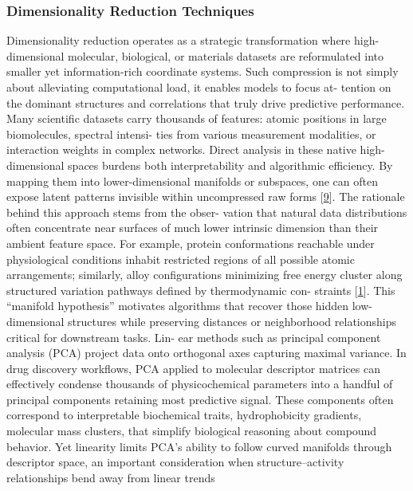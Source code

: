 \documentclass[
]{article}
\begin{document}
\subsubsection{Dimensionality Reduction
Techniques}\label{dimensionality-reduction-techniques}

Dimensionality reduction operates as a strategic transformation where
high-dimensional molecular, biological, or materials datasets are
reformulated into smaller yet information-rich coordinate systems. Such
compression is not simply about alleviating computational load, it
enables models to focus at- tention on the dominant structures and
correlations that truly drive predictive performance. Many scientific
datasets carry thousands of features: atomic positions in large
biomolecules, spectral intensi- ties from various measurement
modalities, or interaction weights in complex networks. Direct analysis
in these native high-dimensional spaces burdens both interpretability
and algorithmic efficiency. By mapping them into lower-dimensional
manifolds or subspaces, one can often expose latent patterns invisible
within uncompressed raw forms {[}\hyperref[_bookmark49]{9}{]}. The
rationale behind this approach stems from the obser- vation that natural
data distributions often concentrate near surfaces of much lower
intrinsic dimension than their ambient feature space. For example,
protein conformations reachable under physiological conditions inhabit
restricted regions of all possible atomic arrangements; similarly, alloy
configurations minimizing free energy cluster along structured variation
pathways defined by thermodynamic con- straints
{[}\hyperref[_bookmark41]{1}{]}. This ``manifold hypothesis'' motivates
algorithms that recover those hidden low-dimensional structures while
preserving distances or neighborhood relationships critical for
downstream tasks. Lin- ear methods such as principal component analysis
(PCA) project data onto orthogonal axes capturing maximal variance. In
drug discovery workflows, PCA applied to molecular descriptor matrices
can effectively condense thousands of physicochemical parameters into a
handful of principal components retaining most predictive signal. These
components often correspond to interpretable biochemical traits,
hydrophobicity gradients, molecular mass clusters, that simplify
biological reasoning about compound behavior. Yet linearity limits PCA's
ability to follow curved manifolds through descriptor space, an
important consideration when structure--activity relationships bend away
from linear trends
\end{document}
